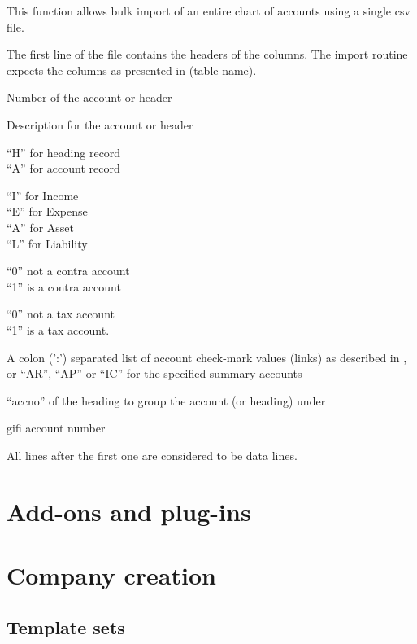 This function allows bulk import of an entire chart of accounts using a
single \gls{csv} file.

The first line of the file contains the headers of the columns. The
import routine expects the columns as presented in (table name).

\begin{description}[style=nextline]
\item [accno] Number of the account or header
\item [desc] Description for the account or header
\item [charttype] ``H'' for heading record \\
``A'' for account record
\item [category] ``I'' for Income \\
``E'' for Expense \\
``A'' for Asset \\
``L'' for Liability
\item [contra] ``0'' not a \gls{contra} account \\
``1'' is a \gls{contra} account
\item [tax] ``0'' not a tax account \\
``1'' is a tax account.
\item [link] A colon (':') separated list of account check-mark values (links) as described
    in , or ``AR'', ``AP'' or ``IC'' for the specified summary accounts
\item [heading] ``accno'' of the heading to group the account (or heading) under
\item [gifi] \gls{gifi} account number
\end{description}

All lines after the first one are considered to be data lines.

\chapter{Add-ons and plug-ins}
\label{cha-customization-add-ons}

\chapter{Company creation}
\label{cha-customization-company-creation}

\section{Template sets}
\label{sec-customization-company-creation-templates}
